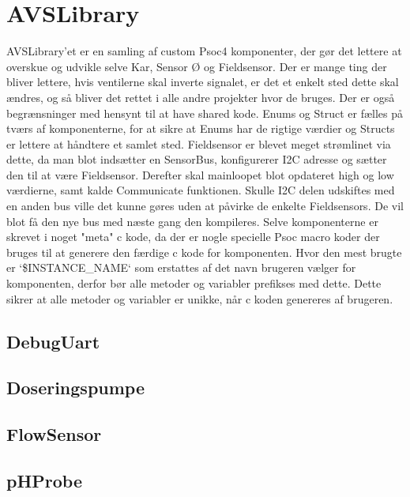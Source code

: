 \section{AVSLibrary}

AVSLibrary'et er en samling af custom Psoc4 komponenter, 
der gør det lettere at overskue og udvikle selve Kar, Sensor Ø og Fieldsensor. 
Der er mange ting der bliver lettere, hvis ventilerne skal inverte signalet, 
er det et enkelt sted dette skal ændres, og så bliver det rettet i alle andre 
projekter hvor de bruges. Der er også begrænsninger med hensynt til at have 
shared kode. Enums og Struct er fælles på tværs af komponenterne, for at 
sikre at Enums har de rigtige værdier og Structs er lettere at håndtere et 
samlet sted. Fieldsensor er blevet meget strømlinet via dette, da man 
blot indsætter en SensorBus, konfigurerer I2C adresse og sætter den til 
at være Fieldsensor. Derefter skal mainloopet blot opdateret high og low 
værdierne, samt kalde Communicate funktionen. Skulle I2C delen udskiftes 
med en anden bus ville det kunne gøres uden at påvirke de enkelte Fieldsensors. 
De vil blot få den nye bus med næste gang den kompileres.
Selve komponenterne er skrevet i noget "meta" c kode, da der er nogle 
specielle Psoc macro koder der bruges til at generere den færdige c kode 
for komponenten. Hvor den mest brugte er `\$INSTANCE\_NAME` som erstattes 
af det navn brugeren vælger for komponenten, derfor bør alle metoder og variabler 
prefikses med dette. Dette sikrer at alle metoder og variabler er unikke, når 
c koden genereres af brugeren.

\subsection{DebugUart}


\subsection{Doseringspumpe}


\subsection{FlowSensor}


\subsection{pHProbe}


